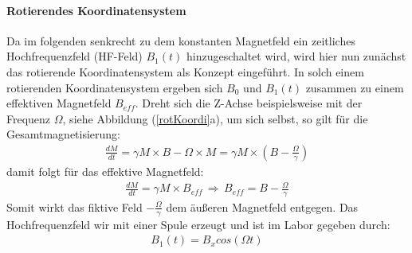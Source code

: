 \paragraph{Rotierendes Koordinatensystem}
Da im folgenden senkrecht zu dem konstanten Magnet\-feld ein zeitliches Hochfrequenzfeld (HF-Feld) $B_1(t)$ hinzugeschaltet wird, wird hier nun zun\"{a}chst das rotierende Koordinatensystem als Konzept eingef\"{u}hrt.
In solch einem rotierenden Koordinatensystem ergeben sich $B_0$ und $B_1(t)$ zusammen zu einem effektiven Magnetfeld $B_{eff}$.
Dreht sich die Z-Achse beispielsweise mit der Frequenz $\Omega$, siehe Abbildung (\ref{rotKoordi}a), um sich selbst, so gilt f\"{u}r die Gesamtmagnetisierung:
\begin{align*}
	\frac{dM}{dt} = \gamma M \times B - \Omega \times M = \gamma M \times \left(B - \frac{\Omega}{\gamma} \right)
\end{align*}
damit folgt f\"{u}r das effektive Magnetfeld:
\begin{align*}
	\frac{dM}{dt} = \gamma M \times B_{eff} \, \Rightarrow \, B_{eff} = B - \frac{\Omega}{\gamma}
\end{align*}
Somit wirkt das fiktive Feld $- \frac{\Omega}{\gamma}$ dem \"{a}u{\ss}eren Magnetfeld entgegen.
Das Hochfrequenzfeld wir mit einer Spule erzeugt und ist im Labor gegeben durch:
\begin{align*}
	B_1(t) = B_x cos(\Omega t)
\end{align*}
